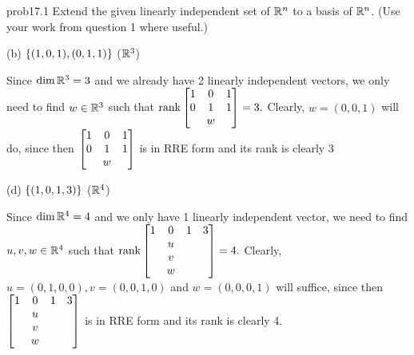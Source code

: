 \begin{sol}{prob17.1} Extend the given linearly independent set of $\mathbb{R}^n$ to a basis of $\mathbb{R}^n$.  (Use your work  from question 1 where useful.)
\medskip

(b) $\{(1, 0,1), (0,1,1) \}$ ($\mathbb{R}^3$)

\soln Since $\dim \mathbb{R}^3=3$ and we already have 2 linearly independent vectors, we only need to find $w\in \mathbb{R}^3$ such that $\rank \bmatrix 1& 0&1\\
0&1&1\\&w\endbmatrix=3.$ Clearly, $w=(0,0,1)$ will do, since then $\bmatrix 1& 0&1\\
0&1&1\\&w\endbmatrix$ is in RRE form and its rank is clearly 3 
\medskip

(d) $\{(1, 0, 1, 3) \}$ ($\mathbb{R}^4$)

\soln Since  $\dim \mathbb{R}^4=4$ and we only have 1 linearly independent vector, we  need to find $u,v,w\in \mathbb{R}^4$ such that $\rank \bmatrix 1&0&1&3\\
&u\\ &v\\&w\endbmatrix=4.$ Clearly, $u=(0,1,0,0), v=(0,0,1,0)$ and $w=(0,0,0,1)$ will suffice, since then $\bmatrix 1&0&1&3\\
&u\\ &v\\&w\endbmatrix$ is in RRE form and its rank is clearly 4.
\medskip
%

\end{sol}